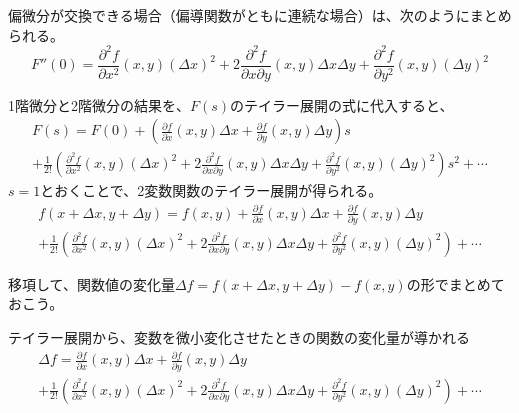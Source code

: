 \documentclass[../../../topic_calculus]{subfiles}
\begin{document}
偏微分が交換できる場合（偏導関数がともに連続な場合）は、次のようにまとめられる。
\begin{equation*}
  F''(0) = \frac{\partial^2 f}{\partial x^2}(x, y)(\Delta x)^2 + 2\frac{\partial^2 f}{\partial x \partial y}(x, y)\Delta x \Delta y + \frac{\partial^2 f}{\partial y^2}(x, y)(\Delta y)^2
\end{equation*}

\br

1階微分と2階微分の結果を、$F(s)$のテイラー展開の式に代入すると、
\begin{multline*}
  F(s) = F(0) + \left(\frac{\partial f}{\partial x}(x, y)\Delta x + \frac{\partial f}{\partial y}(x, y)\Delta y\right)s \\ + \frac{1}{2!}\left(\frac{\partial^2 f}{\partial x^2}(x, y)(\Delta x)^2 + 2\frac{\partial^2 f}{\partial x \partial y}(x, y)\Delta x \Delta y + \frac{\partial^2 f}{\partial y^2}(x, y)(\Delta y)^2\right)s^2 + \cdots
\end{multline*}
$s = 1$とおくことで、2変数関数のテイラー展開が得られる。
\begin{multline*}
  f(x + \Delta x, y + \Delta y) = f(x, y) + \frac{\partial f}{\partial x}(x, y)\Delta x + \frac{\partial f}{\partial y}(x, y)\Delta y \\ + \frac{1}{2!}\left(\frac{\partial^2 f}{\partial x^2}(x, y)(\Delta x)^2 + 2\frac{\partial^2 f}{\partial x \partial y}(x, y)\Delta x \Delta y + \frac{\partial^2 f}{\partial y^2}(x, y)(\Delta y)^2\right) + \cdots
\end{multline*}

\br

移項して、関数値の変化量$\Delta f = f(x + \Delta x, y + \Delta y) - f(x, y)$の形でまとめておこう。

\begin{emphabox}
  \begin{spacebox}
    \begin{center}
      テイラー展開から、変数を微小変化させたときの関数の変化量が導かれる
      \begin{multline*}
        \Delta f = \frac{\partial f}{\partial x}(x, y)\Delta x + \frac{\partial f}{\partial y}(x, y)\Delta y \\ + \frac{1}{2!}\left(\frac{\partial^2 f}{\partial x^2}(x, y)(\Delta x)^2 + 2\frac{\partial^2 f}{\partial x \partial y}(x, y)\Delta x \Delta y + \frac{\partial^2 f}{\partial y^2}(x, y)(\Delta y)^2\right) + \cdots
      \end{multline*}
    \end{center}
  \end{spacebox}
\end{emphabox}
\end{document}
